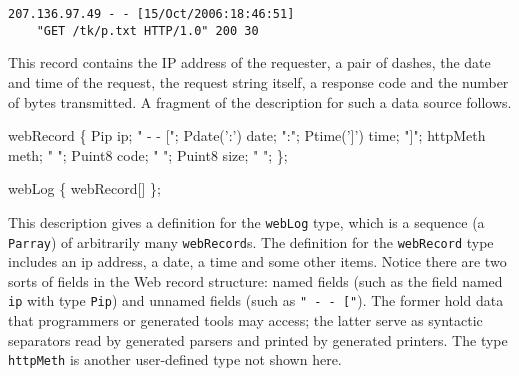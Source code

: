 \documentclass{sig-alternate-sigmod08}
\begin{document}
{\small \begin{verbatim}
207.136.97.49 - - [15/Oct/2006:18:46:51] 
	"GET /tk/p.txt HTTP/1.0" 200 30
\end{verbatim}
}
This record contains the IP address of the requester, a pair of
dashes, the date and time of the request, the request string itself, 
a response code and the number of bytes transmitted.  A fragment of the
\pads{} description for such a data source follows.  
\begin{code}
 webRecord \{
  Pip        ip;   " - - [";          
  Pdate(':') date; ":";
  Ptime(']') time; "]";     
  httpMeth   meth; " ";
  Puint8     code; " "; 
  Puint8     size; " "; \};

 webLog \{ webRecord[] \};
\end{code}
This description gives a definition
for the {\tt webLog} type, which is a sequence (a {\tt Parray})
of arbitrarily many {\tt webRecord}s.  The definition
for the {\tt webRecord} type includes an ip address, a date,
a time and some other items.  Notice there are two sorts of fields
in the Web record structure: named fields (such as the field named
{\tt ip} with type {\tt Pip}) and unnamed fields (such as 
{\tt  " - - ["}).  The former hold data that programmers or generated
tools may access; the latter serve as syntactic separators read by
generated parsers and printed by generated printers.  The type
{\tt httpMeth} is another user-defined type not shown here.


\end{document}
